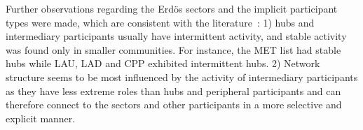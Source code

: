 Further observations regarding the Erd\"os sectors
and the implicit participant types were made, which are consistent with the literature~\cite{barabasiEvo}: 1) hubs and intermediary participants usually have intermittent activity, and stable activity was found only in smaller communities. For instance, the MET list had stable hubs while LAU, LAD and CPP exhibited intermittent hubs.
2) Network structure seems to be most influenced by the
activity of intermediary participants as they have less extreme
roles than hubs and peripheral participants and
can therefore connect to the sectors and other participants 
in a more selective and explicit manner.







%
%
%

